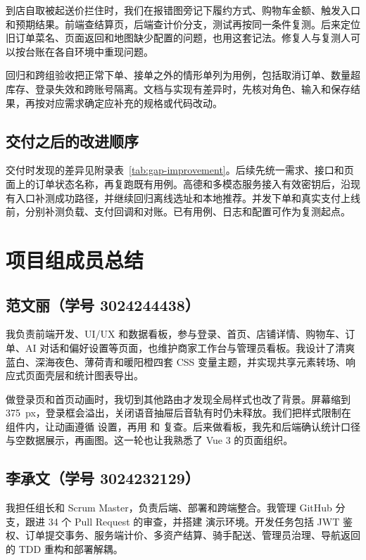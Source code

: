 到店自取被起送价拦住时，我们在报错图旁记下履约方式、购物车金额、触发入口和预期结果。前端查结算页，后端查计价分支，测试再按同一条件复测。后来定位旧订单菜名、页面返回和地图缺少配置的问题，也用这套记法。修复人与复测人可以按台账在各自环境中重现问题。

回归和跨组验收把正常下单、接单之外的情形单列为用例，包括取消订单、数量超库存、登录失效和跨账号隔离。文档与实现有差异时，先核对角色、输入和保存结果，再按对应需求确定应补充的规格或代码改动。

\subsection{交付之后的改进顺序}

交付时发现的差异见附录表~\ref{tab:gap-improvement}。后续先统一需求、接口和页面上的订单状态名称，再复跑既有用例。高德和多模态服务接入有效密钥后，沿现有入口补测成功路径，并继续回归离线选址和本地推荐。并发下单和真实支付上线前，分别补测负载、支付回调和对账。已有用例、日志和配置可作为复测起点。

\section{项目组成员总结}

\subsection{范文丽（学号 3024244438）}

我负责前端开发、UI/UX 和数据看板，参与登录、首页、店铺详情、购物车、订单、AI 对话和偏好设置等页面，也维护商家工作台与管理员看板。我设计了清爽蓝白、深海夜色、薄荷青和暖阳橙四套 CSS 变量主题，并实现共享元素转场、响应式页面壳层和统计图表导出。

做登录页和首页动画时，我切到其他路由才发现全局样式也改了背景。屏幕缩到 375~px，登录框会溢出，关闭语音抽屉后音轨有时仍未释放。我们把样式限制在组件内，让动画遵循  设置，再用  和  复查。后来做看板，我先和后端确认统计口径与空数据展示，再画图。这一轮也让我熟悉了 Vue 3 的页面组织。

\subsection{李承文（学号 3024232129）}

我担任组长和 Scrum Master，负责后端、部署和跨端整合。我管理 GitHub 分支，跟进 34 个 Pull Request 的审查，并搭建  演示环境。开发任务包括 JWT 鉴权、订单提交事务、服务端计价、多资产结算、骑手配送、管理员治理、导航返回的 TDD 重构和部署解耦。

